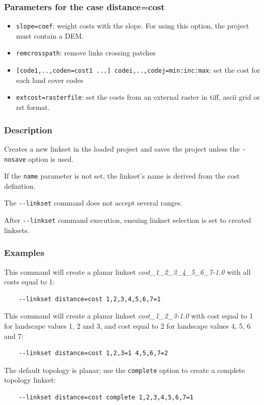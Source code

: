 \documentclass[a4paper,10pt]{report}
\begin{document}
\subsubsection{Parameters for the case distance=cost}
\begin{itemize}
	\item \verb|slope=coef|: weight costs with the slope. For using this option, the project must contain a DEM.
	\item \verb|remcrosspath|: remove links crossing patches
	\item \verb|[code1,..,coden=cost1 ...] codei,..,codej=min:inc:max|: set the cost for each land cover codes
	\item \verb|extcost=rasterfile|: set the costs from an external raster in tiff, ascii grid or rst format.
\end{itemize}

\subsubsection{Description}
Creates a new linkset in the loaded project and saves the project unless the \verb|-nosave| option is used. 

If the \verb|name| parameter is not set, the linkset's name is derived from the cost definition.

The \verb|--linkset| command does not accept several ranges.

After \verb|--linkset| command execution, ensuing linkset selection is set to created linksets.

\subsubsection{Examples}
This command will create a planar linkset \textit{cost\_1\_2\_3\_4\_5\_6\_7-1.0} with all costs equal to 1:
\begin{Verbatim}
	--linkset distance=cost 1,2,3,4,5,6,7=1
\end{Verbatim}

This command will create a planar linkset \textit{cost\_1\_2\_3-1.0} with cost equal to 1 for landscape values 1, 2 and 3, and cost equal to 2 for landscape values 4, 5, 6 and 7:
\begin{Verbatim}
	--linkset distance=cost 1,2,3=1 4,5,6,7=2
\end{Verbatim}

The default topology is planar; use the \verb|complete| option to create a complete topology linkset:
\begin{Verbatim}
	--linkset distance=cost complete 1,2,3,4,5,6,7=1
\end{Verbatim}
\end{document}
